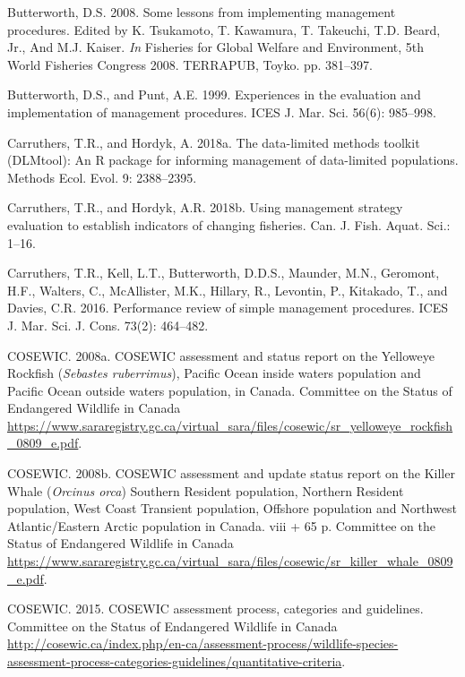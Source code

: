 \documentclass[11pt]{book}
\begin{document}
\leavevmode\hypertarget{ref-butterworth2008}{}%
Butterworth, D.S. 2008. Some lessons from implementing management procedures. Edited by K. Tsukamoto, T. Kawamura, T. Takeuchi, T.D. Beard, Jr., And M.J. Kaiser. \emph{In} Fisheries for Global Welfare and Environment, 5th World Fisheries Congress 2008. TERRAPUB, Toyko. pp. 381--397.

\leavevmode\hypertarget{ref-butterworth1999}{}%
Butterworth, D.S., and Punt, A.E. 1999. Experiences in the evaluation and implementation of management procedures. ICES J. Mar. Sci. 56(6): 985--998.

\leavevmode\hypertarget{ref-carruthers2018}{}%
Carruthers, T.R., and Hordyk, A. 2018a. The data-limited methods toolkit (DLMtool): An R package for informing management of data-limited populations. Methods Ecol. Evol. 9: 2388--2395.

\leavevmode\hypertarget{ref-carruthers_hordyk_2018}{}%
Carruthers, T.R., and Hordyk, A.R. 2018b. Using management strategy evaluation to establish indicators of changing fisheries. Can. J. Fish. Aquat. Sci.: 1--16.

\leavevmode\hypertarget{ref-carruthers2016}{}%
Carruthers, T.R., Kell, L.T., Butterworth, D.D.S., Maunder, M.N., Geromont, H.F., Walters, C., McAllister, M.K., Hillary, R., Levontin, P., Kitakado, T., and Davies, C.R. 2016. Performance review of simple management procedures. ICES J. Mar. Sci. J. Cons. 73(2): 464--482.

\leavevmode\hypertarget{ref-cosewic2008}{}%
COSEWIC. 2008a. COSEWIC assessment and status report on the Yelloweye Rockfish (\emph{Sebastes ruberrimus}), Pacific Ocean inside waters population and Pacific Ocean outside waters population, in Canada. Committee on the Status of Endangered Wildlife in Canada \url{https://www.sararegistry.gc.ca/virtual_sara/files/cosewic/sr_yelloweye_rockfish_0809_e.pdf}.

\leavevmode\hypertarget{ref-cosewic2008b}{}%
COSEWIC. 2008b. COSEWIC assessment and update status report on the Killer Whale (\emph{Orcinus orca}) Southern Resident population, Northern Resident population, West Coast Transient population, Offshore population and Northwest Atlantic/Eastern Arctic population in Canada. viii + 65 p. Committee on the Status of Endangered Wildlife in Canada \url{https://www.sararegistry.gc.ca/virtual_sara/files/cosewic/sr_killer_whale_0809_e.pdf}.

\leavevmode\hypertarget{ref-cosewic2015}{}%
COSEWIC. 2015. COSEWIC assessment process, categories and guidelines. Committee on the Status of Endangered Wildlife in Canada \url{http://cosewic.ca/index.php/en-ca/assessment-process/wildlife-species-assessment-process-categories-guidelines/quantitative-criteria}.
\end{document}
